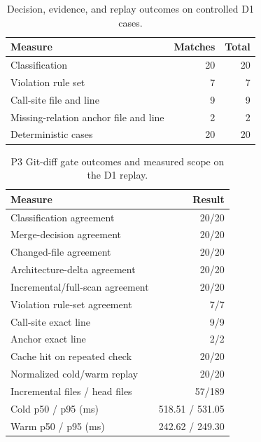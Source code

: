 \documentclass[conference]{IEEEtran}
\begin{document}
\begin{table}[t]
  \caption{Decision, evidence, and replay outcomes on controlled D1 cases.}
  \label{tab:outcome-results}
  \centering
  \small
  \begin{tabular}{lrr}
    \hline
    Measure & Matches & Total \\
    \hline
    Classification & 20 & 20 \\
    Violation rule set & 7 & 7 \\
    Call-site file and line & 9 & 9 \\
    Missing-relation anchor file and line & 2 & 2 \\
    Deterministic cases & 20 & 20 \\
    \hline
  \end{tabular}
\end{table}

\begin{table}[t]
  \caption{P3 Git-diff gate outcomes and measured scope on the D1 replay.}
  \label{tab:phase3-results}
  \centering
  \small
  \begin{tabular}{lr}
    \hline
    Measure & Result \\
    \hline
    Classification agreement & 20/20 \\
    Merge-decision agreement & 20/20 \\
    Changed-file agreement & 20/20 \\
    Architecture-delta agreement & 20/20 \\
    Incremental/full-scan agreement & 20/20 \\
    Violation rule-set agreement & 7/7 \\
    Call-site exact line & 9/9 \\
    Anchor exact line & 2/2 \\
    Cache hit on repeated check & 20/20 \\
    Normalized cold/warm replay & 20/20 \\
    Incremental files / head files & 57/189 \\
    Cold p50 / p95 (ms) & 518.51 / 531.05 \\
    Warm p50 / p95 (ms) & 242.62 / 249.30 \\
    \hline
  \end{tabular}
\end{table}
\end{document}
